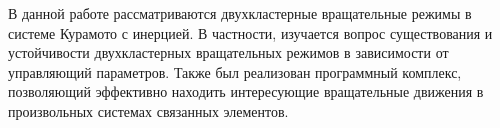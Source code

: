 В данной работе рассматриваются двухкластерные вращательные режимы в системе Курамото с инерцией. 
В частности, изучается вопрос существования и устойчивости двухкластерных вращательных режимов в зависимости от управляющий параметров.
Также был реализован программный комплекс, позволяющий эффективно находить интересующие вращательные
движения в произвольных системах связанных элементов.
